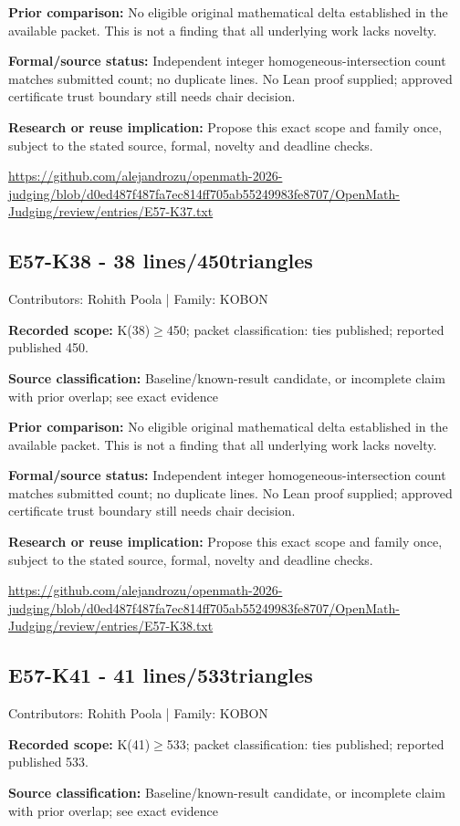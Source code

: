 \documentclass[11pt,a4paper]{article}
\begin{document}
\textbf{Prior comparison:} No eligible original mathematical delta established in the available packet. This is not a finding that all underlying work lacks novelty.

\textbf{Formal/source status:} Independent integer homogeneous-intersection count matches submitted count; no duplicate lines. No Lean proof supplied; approved certificate trust boundary still needs chair decision.

\textbf{Research or reuse implication:} Propose this exact scope and family once, subject to the stated source, formal, novelty and deadline checks.

{\small \url{https://github.com/alejandrozu/openmath-2026-judging/blob/d0ed487f487fa7ec814ff705ab55249983fe8707/OpenMath-Judging/review/entries/E57-K37.txt}\par}

\begin{samepage}
\subsection{E57-K38  -  38 lines/450triangles}
{\small Contributors: Rohith Poola | Family: KOBON\par}

\textbf{Recorded scope:} K(38)\ensuremath{\geq}450; packet classification: ties published; reported published 450.

\end{samepage}
\textbf{Source classification:} Baseline/known-result candidate, or incomplete claim with prior overlap; see exact evidence

\textbf{Prior comparison:} No eligible original mathematical delta established in the available packet. This is not a finding that all underlying work lacks novelty.

\textbf{Formal/source status:} Independent integer homogeneous-intersection count matches submitted count; no duplicate lines. No Lean proof supplied; approved certificate trust boundary still needs chair decision.

\textbf{Research or reuse implication:} Propose this exact scope and family once, subject to the stated source, formal, novelty and deadline checks.

{\small \url{https://github.com/alejandrozu/openmath-2026-judging/blob/d0ed487f487fa7ec814ff705ab55249983fe8707/OpenMath-Judging/review/entries/E57-K38.txt}\par}

\begin{samepage}
\subsection{E57-K41  -  41 lines/533triangles}
{\small Contributors: Rohith Poola | Family: KOBON\par}

\textbf{Recorded scope:} K(41)\ensuremath{\geq}533; packet classification: ties published; reported published 533.

\end{samepage}
\textbf{Source classification:} Baseline/known-result candidate, or incomplete claim with prior overlap; see exact evidence
\end{document}
